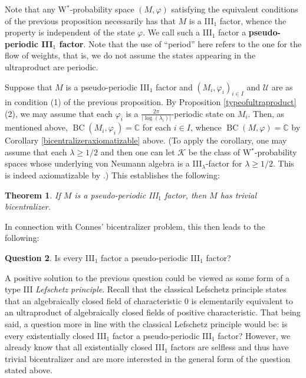 \documentclass[12pt]{amsart}
\newtheorem{thm}{Theorem}[section]
\theoremstyle{definition}
\newtheorem{question}[thm]{Question}
\def\bb{\mathbb}
\def\bb{\mathbb}
\def\cal{\mathcal}
\def\u{\mathsf 1}
\def \u{\mathcal U}
\def\BC{\operatorname{BC}}
\begin{document}
Note that any W$^*$-probability space $(M,\varphi)$ satisfying the equivalent conditions of the previous proposition necessarily has that $M$ is a III$_1$ factor, whence the property is independent of the state $\varphi$.  We call such a III$_1$ factor a \textbf{pseudo-periodic III$_1$ factor}. Note that the use of ``period'' here refers to the one for the flow of weights, that is, we do not assume the states appearing in the ultraproduct are periodic. 

Suppose that $M$ is a pseudo-periodic III$_1$ factor and $(M_i,\varphi_i)_{i\in I}$ and $\u$ are as in condition (1) of the previous proposition.  By Proposition \ref{typeofultraproduct}(2), we may assume that each $\varphi_i$ is a $\frac{2\pi}{|\log(\lambda_i)|}$-periodic state on $M_i$.  Then, as mentioned above, $\BC(M_i,\varphi_i)=\bb C$ for each $i\in I$, whence $\BC(M,\varphi)=\bb C$ by Corollary \ref{bicentralizeraxiomatizable} above.  (To apply the corollary, one may assume that each $\lambda\geq 1/2$ and then one can let $\cal K$ be the class of W$^*$-probability spaces whose underlying von Neumann algebra is a III$_\lambda$-factor for $\lambda\geq 1/2$.  This is indeed axiomatizable by \cite[Proposition 8.8]{AGHS25}.)  This establishes the following:

\begin{thm}
If $M$ is a pseudo-periodic III$_1$ factor, then $M$ has trivial bicentralizer.
\end{thm}

In connection with Connes' bicentralizer problem, this then leads to the following:

\begin{question}
Is every III$_1$ factor a pseudo-periodic III$_1$ factor?
\end{question}

A positive solution to the previous question could be viewed as some form of a type III \emph{Lefschetz principle}.  Recall that the classical Lefschetz principle states that an algebraically closed field of characteristic $0$ is elementarily equivalent to an ultraproduct of algebraically closed fields of positive characteristic.  That being said, a question more in line with the classical Lefschetz principle would be:  is every existentially closed III$_1$ factor a pseudo-periodic III$_1$ factor?  However, we already know that all existentially closed III$_1$ factors are selfless and thus have trivial bicentralizer and are more interested in the general form of the question stated above.
\end{document}
